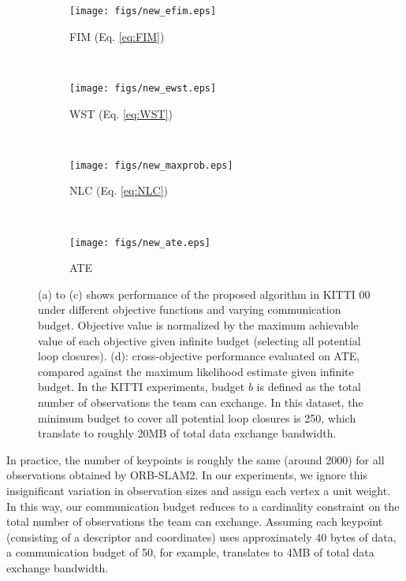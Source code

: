 \documentclass[conference]{IEEEtran}
\begin{document}
\begin{figure*}[t]
  \begin{subfigure}[t]{0.23\textwidth}
	\centering
	\texttt{[image: figs/new\_efim.eps]}
	\caption{\small FIM (Eq. \ref{eq:FIM})}
	\label{fig:results_full_KITTI_00_FIM}
  \end{subfigure}
  ~
  \begin{subfigure}[t]{0.23\textwidth}
	\centering
	\texttt{[image: figs/new\_ewst.eps]}
	\caption{\small WST (Eq. \ref{eq:WST})}
	\label{fig:results_full_KITTI_00_WST}
  \end{subfigure}
  ~
  \begin{subfigure}[t]{0.23\textwidth}
	\centering
	\texttt{[image: figs/new\_maxprob.eps]}
	\caption{\small NLC (Eq. \ref{eq:NLC})}
	\label{fig:results_full_KITTI_00_LC}
  \end{subfigure}
  ~
\begin{subfigure}[t]{0.23\textwidth}
\centering
\texttt{[image: figs/new\_ate.eps]}
\caption{\small ATE }
\label{fig:results_full_KITTI_00_realized}
\end{subfigure}
\caption{\small (a) to (c) shows performance of the proposed algorithm in KITTI 00 under
different objective functions and varying communication budget. Objective value is normalized by the maximum achievable value of each objective given infinite budget (selecting all potential loop closures). (d): cross-objective performance evaluated on ATE, compared against the maximum likelihood estimate given infinite budget. In the KITTI experiments, budget $b$ is defined as the total number of observations the team can exchange. In this dataset, the minimum budget to cover all potential loop closures is 250, which translate to roughly 20MB of total data exchange bandwidth.}
\label{fig:results_full_KITTI_00}
\vspace{-0.3cm}
\end{figure*}


In practice, the number of keypoints is roughly the same (around 2000) for all observations obtained by ORB-SLAM2. In our experiments, we ignore this insignificant variation in observation sizes and assign each vertex a unit weight. In this way, our communication budget reduces to a cardinality constraint on the total number of observations the team can exchange. 
Assuming each keypoint (consisting of a descriptor and coordinates) 
uses approximately 40 bytes of data, a communication budget of 50, for example, translates to 4MB of total data exchange bandwidth.
\end{document}
